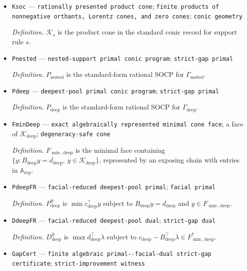 \documentclass{article}
\begin{document}
\begin{itemize}
  \item \texttt{Ksoc} --- \texttt{rationally presented product cone}; \texttt{finite products of nonnegative orthants,\allowbreak{} Lorentz cones,\allowbreak{} and zero cones}; \texttt{conic geometry}
  \par\smallskip\noindent\emph{Definition.} \(\mathcal K_s\) is the product cone in the standard conic record for support rule \(s\).
  \item \texttt{Pnested} --- \texttt{nested-\allowbreak{}support primal conic program}; \texttt{strict-\allowbreak{}gap primal}
  \par\smallskip\noindent\emph{Definition.} \(P_{\mathrm{nested}}\) is the standard-form rational SOCP for \(\Gamma_{\mathrm{nested}}\).
  \item \texttt{Pdeep} --- \texttt{deepest-\allowbreak{}pool primal conic program}; \texttt{strict-\allowbreak{}gap primal}
  \par\smallskip\noindent\emph{Definition.} \(P_{\mathrm{deep}}\) is the standard-form rational SOCP for \(\Gamma_{\mathrm{deep}}\).
  \item \texttt{FminDeep} --- \texttt{exact algebraically represented minimal cone face}; a face of \(\mathcal K_{\mathrm{deep}}\); \texttt{degeneracy-\allowbreak{}safe cone}
  \par\smallskip\noindent\emph{Definition.} \(F_{\min,\mathrm{deep}}\) is the minimal face containing \(\{y:B_{\mathrm{deep}}y=d_{\mathrm{deep}},\ y\in\mathcal K_{\mathrm{deep}}\}\), represented by an exposing chain with entries in \(\mathbb A_{\mathrm{rep}}\).
  \item \texttt{PdeepFR} --- \texttt{facial-\allowbreak{}reduced deepest-\allowbreak{}pool primal}; \texttt{facial primal}
  \par\smallskip\noindent\emph{Definition.} \(P^{\mathrm{fr}}_{\mathrm{deep}}\) is \(\min c_{\mathrm{deep}}^{\top}y\) subject to \(B_{\mathrm{deep}}y=d_{\mathrm{deep}}\) and \(y\in F_{\min,\mathrm{deep}}\).
  \item \texttt{DdeepFR} --- \texttt{facial-\allowbreak{}reduced deepest-\allowbreak{}pool dual}; \texttt{strict-\allowbreak{}gap dual}
  \par\smallskip\noindent\emph{Definition.} \(D^{\mathrm{fr}}_{\mathrm{deep}}\) is \(\max d_{\mathrm{deep}}^{\top}\lambda\) subject to \(c_{\mathrm{deep}}-B_{\mathrm{deep}}^{\top}\lambda\in F_{\min,\mathrm{deep}}^*\).
  \item \texttt{GapCert} --- \texttt{finite algebraic primal-\allowbreak{}-\allowbreak{}facial-\allowbreak{}dual strict-\allowbreak{}gap certificate}; \texttt{strict-\allowbreak{}improvement witness}

\end{itemize}
\end{document}
